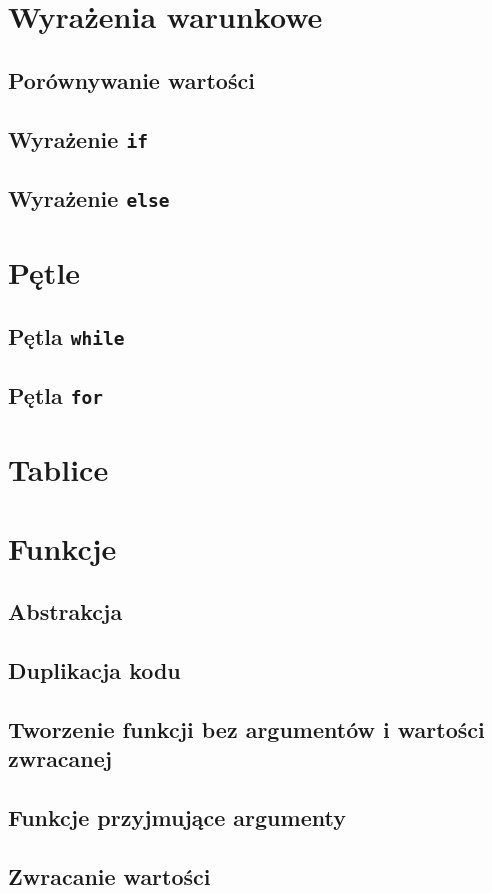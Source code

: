 \documentclass[11pt]{book}
\begin{document}
\chapter{Wyrażenia warunkowe}
\section{Porównywanie wartości}
\section{Wyrażenie \texttt{if}}
\section{Wyrażenie \texttt{else}}

\chapter{Pętle}
\section{Pętla \texttt{while}}
\section{Pętla \texttt{for}}

\chapter{Tablice}

\chapter{Funkcje}
\section{Abstrakcja}
\section{Duplikacja kodu}
\section{Tworzenie funkcji bez argumentów i wartości zwracanej}
\section{Funkcje przyjmujące argumenty}
\section{Zwracanie wartości}
\end{document}
